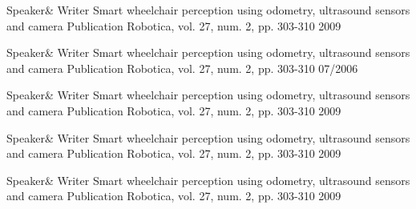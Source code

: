 
\begin{cventries}

  \cventry
    {Speaker\& Writer} %
    {Smart wheelchair perception using odometry, ultrasound sensors and camera} %
    {Publication Robotica, vol. 27, num. 2, pp. 303-310} %
    {2009} %
    {}

  \cventry
    {Speaker\& Writer} %
    {Smart wheelchair perception using odometry, ultrasound sensors and camera} %
    {Publication Robotica, vol. 27, num. 2, pp. 303-310} %
    {07/2006} %
    {}

  \cventry
    {Speaker\& Writer} %
    {Smart wheelchair perception using odometry, ultrasound sensors and camera} %
    {Publication Robotica, vol. 27, num. 2, pp. 303-310} %
    {2009} %
    {}


  \cventry
    {Speaker\& Writer} %
    {Smart wheelchair perception using odometry, ultrasound sensors and camera} %
    {Publication Robotica, vol. 27, num. 2, pp. 303-310} %
    {2009} %
    {}


  \cventry
    {Speaker\& Writer} %
    {Smart wheelchair perception using odometry, ultrasound sensors and camera} %
    {Publication Robotica, vol. 27, num. 2, pp. 303-310} %
    {2009} %
    {}

\end{cventries}
